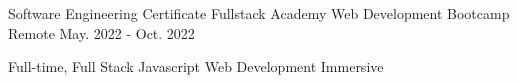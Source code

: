 

\begin{cventries}

  \cventry
    {Software Engineering Certificate} %
    {Fullstack Academy Web Development Bootcamp} %
    {Remote} %
    {May. 2022 - Oct. 2022} %
    {
      \begin{cvitems} %
        \item {Full-time, Full Stack Javascript Web Development Immersive}
      \end{cvitems}
    }

\end{cventries}
